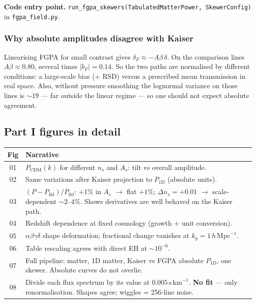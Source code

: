 \documentclass[11pt]{article}
\begin{document}
\textbf{Code entry point.}
\texttt{run\_fgpa\_skewers(TabulatedMatterPower, SkewerConfig)} in \texttt{fgpa\_field.py}.

\subsubsection{Why absolute amplitudes disagree with Kaiser}

Linearising FGPA for small contrast gives $\delta_F\approx -A\beta\,\delta$.
On the comparison lines $A\beta\approx 0.80$, several times $|b_F|=0.14$.
So the two paths are normalised by different conditions: a large-scale bias (+ RSD) versus a prescribed mean transmission in real space.
Also, without pressure smoothing the lognormal variance on those lines is $\sim 19$ --- far outside the linear regime --- so one should not expect absolute agreement.

\subsection{Part I figures in detail}

\begin{center}
\small
\begin{tabular}{@{}cp{}@{}}
\toprule
Fig & Narrative \\
\midrule
01 & $P_\mathrm{CDM}(k)$ for different $n_s$ and $A_s$: tilt vs overall amplitude. \\
02 & Same variations after Kaiser projection to $P_{1\mathrm{D}}$ (absolute units). \\
03 & $(P-P_{\mathrm{fid}})/P_{\mathrm{fid}}$:
$+1\%$ in $A_s$ $\to$ flat $+1\%$;
$\Delta n_s=+0.01$ $\to$ scale-dependent $\sim 2$--$4\%$.
Shows derivatives are well behaved on the Kaiser path. \\
04 & Redshift dependence at fixed cosmology (growth + unit conversion). \\
05 & $\alpha\beta\gamma\delta$ shape deformation; fractional change vanishes at $k_p=1\,h\,\mathrm{Mpc}^{-1}$. \\
06 & Table rescaling agrees with direct EH at $\sim 10^{-6}$. \\
07 & Full pipeline: matter, 1D matter, Kaiser vs FGPA absolute $P_{1\mathrm{D}}$, one skewer.
Absolute curves do not overlie. \\
08 & Divide each flux spectrum by its value at $0.005\,\mathrm{s\,km}^{-1}$.
\textbf{No fit} --- only renormalisation.
Shapes agree; wiggles = 256-line noise. \\
\bottomrule
\end{tabular}
\end{center}
\end{document}
